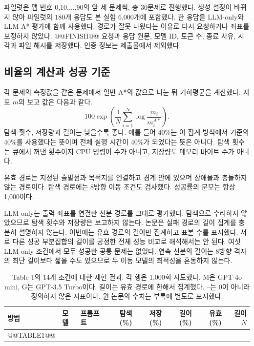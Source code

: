 \documentclass[11pt]{article}
\begin{document}
파일럿은 맵 번호 0,10,$\ldots$,90의 앞 세 문제씩, 총 30문제로 진행했다. 생성 설정이 바뀌지 않아 파일럿의 180개 응답도 본 실험 6,000개에 포함했다. 한 응답을 LLM-only와 LLM-A* 평가에 함께 사용했다. 경로가 잘못 나왔다는 이유로 다시 요청하거나 좌표를 보정하지 않았다. @@FINISH@@ 요청과 응답 원문, 모델 ID, 토큰 수, 종료 사유, 시각과 파일 해시를 저장했다. 인증 정보는 제출물에서 제외했다.

\subsection{비율의 계산과 성공 기준}
각 문제의 측정값을 같은 문제에서 일반 A*의 값으로 나눈 뒤 기하평균을 계산했다. 지표 $m$의 보고 값은 다음과 같다.
\begin{equation}
100\exp\left(\frac{1}{N}\sum_{i=1}^{N}\log\frac{m_i}{m_i^{A*}}\right).
\end{equation}
탐색 횟수, 저장량과 길이는 낮을수록 좋다. 예를 들어 40\%는 이 집계 방식에서 기준의 40\%를 사용했다는 뜻이며 전체 실행 시간이 40\%가 되었다는 뜻은 아니다. 탐색 횟수는 큐에서 꺼낸 횟수이지 CPU 명령어 수가 아니고, 저장량도 메모리 바이트 수가 아니다.

유효 경로는 지정된 출발점과 목적지를 연결하고 경계 안에 있으며 장애물과 충돌하지 않는 경로이다. 탐색 경로에는 8방향 이동 조건도 검사했다. 성공률의 분모는 항상 1,000이다.

LLM-only는 출력 좌표를 연결한 선분 경로를 그대로 평가했다. 탐색으로 수리하지 않았으므로 탐색 횟수와 저장량은 보고하지 않는다. 논문은 실패 경로의 길이 집계를 충분히 설명하지 않는다. 이번에는 유효 경로의 길이만 집계하고 표본 수를 표시했다. 서로 다른 성공 부분집합의 길이를 공정한 전체 성능 비교로 해석해서는 안 된다. 여섯 LLM-only 조건에서 모두 성공한 공통 문제는 없었다. 연속 선분의 길이는 8방향 격자의 최단 길이보다 짧을 수도 있으므로 두 이동 모델의 최적성을 혼동하지 않는다.

\begin{table}[t]
\centering\small
\begin{tabular}{lllrrrrr}
\toprule
방법 & 모델 & 프롬프트 & 탐색(\%) & 저장(\%) & 길이(\%) & 유효(\%) & 길이 $N$\\
\midrule
@@TABLE1@@
\bottomrule
\end{tabular}
\caption{Table 1의 14개 조건에 대한 재현 결과. 각 행은 1,000회 시도했다. M은 GPT-4o mini, G는 GPT-3.5 Turbo이다. 길이는 유효 경로에 한해서 집계했다. --는 0이 아니라 정의하지 않은 지표이다. 원 논문의 수치는 부록에 별도로 표시했다.}
\label{tab:reproduction}
\end{table}
\end{document}
